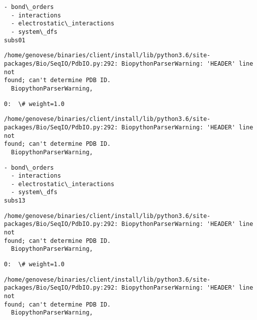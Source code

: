 \documentclass[11pt]{article}
\begin{document}
    \begin{Verbatim}[commandchars=\\\{\}]
  - bond\_orders
  - interactions
  - electrostatic\_interactions
  - system\_dfs
subs01
    \end{Verbatim}

    \begin{Verbatim}[commandchars=\\\{\}]
/home/genovese/binaries/client/install/lib/python3.6/site-
packages/Bio/SeqIO/PdbIO.py:292: BiopythonParserWarning: 'HEADER' line not
found; can't determine PDB ID.
  BiopythonParserWarning,
    \end{Verbatim}

    \begin{Verbatim}[commandchars=\\\{\}]
0:  \# weight=1.0
    \end{Verbatim}

    \begin{Verbatim}[commandchars=\\\{\}]
/home/genovese/binaries/client/install/lib/python3.6/site-
packages/Bio/SeqIO/PdbIO.py:292: BiopythonParserWarning: 'HEADER' line not
found; can't determine PDB ID.
  BiopythonParserWarning,
    \end{Verbatim}

    \begin{Verbatim}[commandchars=\\\{\}]
  - bond\_orders
  - interactions
  - electrostatic\_interactions
  - system\_dfs
subs13
    \end{Verbatim}

    \begin{Verbatim}[commandchars=\\\{\}]
/home/genovese/binaries/client/install/lib/python3.6/site-
packages/Bio/SeqIO/PdbIO.py:292: BiopythonParserWarning: 'HEADER' line not
found; can't determine PDB ID.
  BiopythonParserWarning,
    \end{Verbatim}

    \begin{Verbatim}[commandchars=\\\{\}]
0:  \# weight=1.0
    \end{Verbatim}

    \begin{Verbatim}[commandchars=\\\{\}]
/home/genovese/binaries/client/install/lib/python3.6/site-
packages/Bio/SeqIO/PdbIO.py:292: BiopythonParserWarning: 'HEADER' line not
found; can't determine PDB ID.
  BiopythonParserWarning,
    \end{Verbatim}
\end{document}
